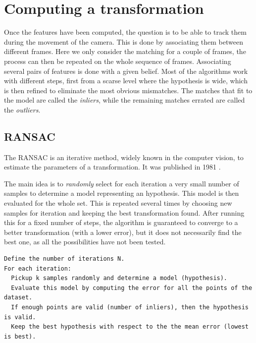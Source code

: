 \section{Computing a transformation}

Once the features have been computed, the question is to be able to track them during the movement of the camera. This is done by associating them between different frames. Here we only consider the matching for a couple of frames, the process can then be repeated on the whole sequence of frames. Associating several pairs of features is done with a given belief. Most of the algorithms work with different steps, first from a scarse level where the hypothesis is wide, which is then refined to eliminate the most obvious mismatches. The matches that fit to the model are called the \emph{inliers}, while the remaining matches errated are called the \emph{outliers}.

\subsection{RANSAC}
\label{sub:ransac}

The \gls{RANSAC} is an iterative method, widely known in the computer vision, to estimate the parameters of a transformation. It was published in 1981 \cite{FischlerB81}.

The main idea is to \emph{randomly} select for each iteration a very small number of samples to determine a model representing an hypothesis. This model is then evaluated for the whole set. This is repeated several times by choosing new samples for iteration and keeping the best transformation found. After running this for a fixed number of steps, the algorithm is guaranteed to converge to a better transformation (with a lower error), but it does not necessarily find the best one, as all the possibilities have not been tested. 

\begin{verbatim}
Define the number of iterations N.
For each iteration:
  Pickup k samples randomly and determine a model (hypothesis).
  Evaluate this model by computing the error for all the points of the dataset.
  If enough points are valid (number of inliers), then the hypothesis is valid.
  Keep the best hypothesis with respect to the the mean error (lowest is best).
\end{verbatim}

